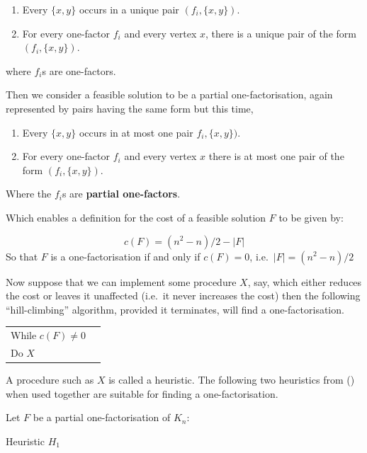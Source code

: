 \documentclass[
  11pt,
  a4paper]{book}
\begin{document}
\begin{enumerate}
\def\labelenumi{\arabic{enumi}.}
\item
  Every \(\{x, y\}\) occurs in a unique pair
  \((f_i, \{x, y\})\).
\item
  For every one-factor \(f_i\) and every vertex \(x\),
  there is a unique pair of the form \((f_i, \{x, y\})\).
\end{enumerate}

where \(f_i\)s are one-factors.

Then we consider a feasible solution to be a partial
one-factorisation, again represented by pairs having the
same form but this time,

\begin{enumerate}
\def\labelenumi{\arabic{enumi}.}
\item
  Every \(\{x, y\}\) occurs in at most one pair
  \(f_i, \{x, y\})\).
\item
  For every one-factor \(f_i\) and every vertex \(x\) there is at most one pair of the form \((f_i, \{x, y\})\).
\end{enumerate}

Where the \(f_i\)s are \textbf{partial one-factors}.

Which enables a definition for the cost of a feasible
solution \(F\) to be given by:

\[c(F) = (n^2 - n)/2 - |F|\]
So that \(F\) is a one-factorisation if and only if
\(c(F) = 0\), i.e.~\(|F| = (n^2 - n)/2\)

Now suppose that we can implement some procedure \(X\), say,
which either reduces the cost or leaves it unaffected
(i.e.~it never increases the cost) then the following
``hill-climbing'' algorithm, provided it terminates,
will find a one-factorisation.

\begin{longtable}[]{@{}ll@{}}
\toprule
\endhead
While \(c(F) \neq 0\) &\tabularnewline
Do \(X\) &\tabularnewline
\bottomrule
\end{longtable}

A procedure such as \(X\) is called a heuristic.
The following two heuristics from
(\textcite{dinitz_hill-climbing_1987})
when used together are suitable for finding a
one-factorisation.

Let \(F\) be a partial one-factorisation of \(K_n\):

Heuristic \(H_1\)
\end{document}

